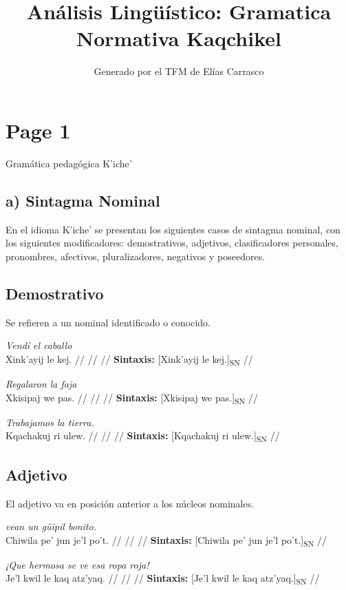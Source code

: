 \documentclass{article}%
\title{Análisis Lingüístico: Gramatica Normativa Kaqchikel}%
\author{Generado por el TFM de Elías Carrasco}%
\begin{document}
%
\normalsize%
\maketitle%
\section{Page 1}%
\label{sec:Page1}%
Gramática pedagógica K'iche' %
\subsection{a) Sintagma Nominal}%
\label{subsec:a)SintagmaNominal}%

%
En el idioma K'iche' se presentan los siguientes casos de sintagma nominal, con los %
siguientes modificadores: demostrativos, adjetivos, clasificadores personales, pronombres, %
afectivos, pluralizadores, negativos y poseedores. %
\subsection{Demostrativo}%
\label{subsec:Demostrativo}%

%
Se refieren a un nominal identificado o conocido. %
\par\medskip%
\ex
\textit{Vendí el caballo} \\
\begingl
\gla Xink'ayij le kej. //
\glb  //
\glc  //
\glft \textbf{Sintaxis:} [Xink'ayij le kej.]\textsubscript{SN} //
\endgl
\xe
%
\medskip%
\par\medskip%
\ex
\textit{Regalaron la faja} \\
\begingl
\gla Xkisipaj we pas. //
\glb  //
\glc  //
\glft \textbf{Sintaxis:} [Xkisipaj we pas.]\textsubscript{SN} //
\endgl
\xe
%
\medskip%
\par\medskip%
\ex
\textit{Trabajamos la tierra.} \\
\begingl
\gla Kqachakuj ri ulew. //
\glb  //
\glc  //
\glft \textbf{Sintaxis:} [Kqachakuj ri ulew.]\textsubscript{SN} //
\endgl
\xe
%
\medskip%
\subsection{Adjetivo}%
\label{subsec:Adjetivo}%

%
El adjetivo va en posición anterior a los núcleos nominales. %
\par\medskip%
\ex
\textit{vean un güipil bonito.} \\
\begingl
\gla Chiwila pe' jun je'l po't. //
\glb  //
\glc  //
\glft \textbf{Sintaxis:} [Chiwila pe' jun je'l po't.]\textsubscript{SN} //
\endgl
\xe
%
\medskip%
\par\medskip%
\ex
\textit{¡Que hermosa se ve esa ropa roja!} \\
\begingl
\gla Je'l kwil le kaq atz'yaq. //
\glb  //
\glc  //
\glft \textbf{Sintaxis:} [Je'l kwil le kaq atz'yaq.]\textsubscript{SN} //
\endgl
\xe
%
\medskip%
\end{document}
